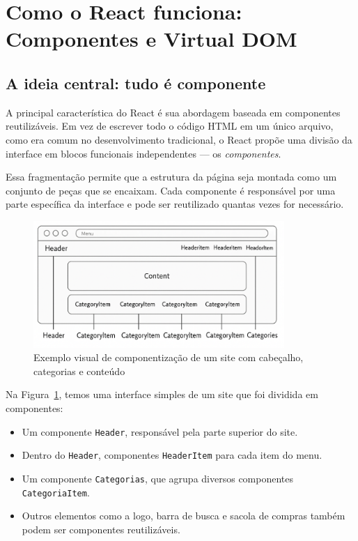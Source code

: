 \section{Como o React funciona: Componentes e Virtual DOM}

\subsection*{A ideia central: tudo é componente}

A principal característica do React é sua abordagem baseada em componentes reutilizáveis. Em vez de escrever todo o código HTML em um único arquivo, como era comum no desenvolvimento tradicional, o React propõe uma divisão da interface em blocos funcionais independentes — os \textit{componentes}.

Essa fragmentação permite que a estrutura da página seja montada como um conjunto de peças que se encaixam. Cada componente é responsável por uma parte específica da interface e pode ser reutilizado quantas vezes for necessário.

\begin{figure}[h!]
  \centering
  \includegraphics[width=0.85\textwidth]{REACT_NATIVE/images/A_text-based_digital_educational_graphic_offers_a_.png.png}
  \caption{Exemplo visual de componentização de um site com cabeçalho, categorias e conteúdo}
  \label{fig:componentizacao}
\end{figure}

Na Figura~\ref{fig:componentizacao}, temos uma interface simples de um site que foi dividida em componentes:

\begin{itemize}
  \item Um componente \texttt{Header}, responsável pela parte superior do site.
  \item Dentro do \texttt{Header}, componentes \texttt{HeaderItem} para cada item do menu.
  \item Um componente \texttt{Categorias}, que agrupa diversos componentes \texttt{CategoriaItem}.
  \item Outros elementos como a logo, barra de busca e sacola de compras também podem ser componentes reutilizáveis.
\end{itemize}

